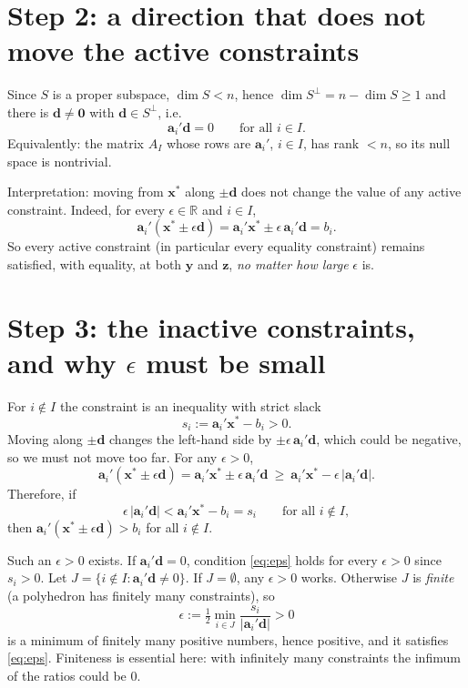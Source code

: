 \documentclass[11pt]{article}
\theoremstyle{remark}
\begin{document}
\section*{Step 2: a direction that does not move the active constraints}
Since $S$ is a proper subspace, $\dim S<n$, hence $\dim S^{\perp}=n-\dim S\ge 1$ and there is $\mathbf d\neq\mathbf 0$ with $\mathbf d\in S^\perp$, i.e.
\[
\mathbf a_i'\mathbf d = 0 \qquad \text{for all } i\in I .
\]
Equivalently: the matrix $A_I$ whose rows are $\mathbf a_i'$, $i\in I$, has rank $<n$, so its null space is nontrivial.

Interpretation: moving from $\mathbf x^*$ along $\pm\mathbf d$ does not change the value of any active constraint. Indeed, for every $\epsilon\in\mathbb{R}$ and $i\in I$,
\[
\mathbf a_i'(\mathbf x^*\pm\epsilon\mathbf d)=\mathbf a_i'\mathbf x^*\pm\epsilon\,\mathbf a_i'\mathbf d = b_i .
\]
So every active constraint (in particular every equality constraint) remains satisfied, with equality, at both $\mathbf y$ and $\mathbf z$, \emph{no matter how large} $\epsilon$ is.

\section*{Step 3: the inactive constraints, and why $\epsilon$ must be small}
For $i\notin I$ the constraint is an inequality with strict slack
\[
s_i := \mathbf a_i'\mathbf x^* - b_i > 0 .
\]
Moving along $\pm\mathbf d$ changes the left-hand side by $\pm\epsilon\,\mathbf a_i'\mathbf d$, which could be negative, so we must not move too far. For any $\epsilon>0$,
\[
\mathbf a_i'(\mathbf x^*\pm\epsilon\mathbf d) = \mathbf a_i'\mathbf x^* \pm \epsilon\,\mathbf a_i'\mathbf d
\ \ge\ \mathbf a_i'\mathbf x^* - \epsilon\,|\mathbf a_i'\mathbf d| .
\]
Therefore, if
\begin{equation}\label{eq:eps}
\epsilon\,|\mathbf a_i'\mathbf d| < \mathbf a_i'\mathbf x^* - b_i = s_i \qquad \text{for all } i\notin I,
\end{equation}
then $\mathbf a_i'(\mathbf x^*\pm\epsilon\mathbf d) > b_i$ for all $i\notin I$.

Such an $\epsilon>0$ exists. If $\mathbf a_i'\mathbf d=0$, condition \eqref{eq:eps} holds for every $\epsilon>0$ since $s_i>0$. Let $J=\{i\notin I : \mathbf a_i'\mathbf d\neq 0\}$. If $J=\emptyset$, any $\epsilon>0$ works. Otherwise $J$ is \emph{finite} (a polyhedron has finitely many constraints), so
\[
\epsilon := \tfrac12 \min_{i\in J} \frac{s_i}{|\mathbf a_i'\mathbf d|} > 0
\]
is a minimum of finitely many positive numbers, hence positive, and it satisfies \eqref{eq:eps}. Finiteness is essential here: with infinitely many constraints the infimum of the ratios could be $0$.
\end{document}
